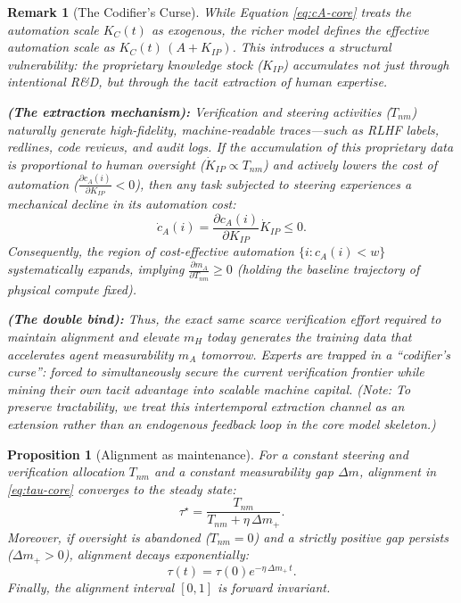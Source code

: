 \documentclass[12pt, letter]{article}
\newtheorem{proposition}{Proposition}
\newtheorem{remark}{Remark}
\begin{document}
\begin{remark}[The Codifier's Curse]\label{rem:senior-loop-core}
While Equation \eqref{eq:cA-core} treats the automation scale $K_C(t)$ as exogenous, the richer model defines the \emph{effective} automation scale as $K_C(t)\,(A + K_{IP})$. This introduces a structural vulnerability: the proprietary knowledge stock ($K_{IP}$) accumulates not just through intentional R\&D, but through the tacit extraction of human expertise.

\textbf{(The extraction mechanism):} Verification and steering activities ($T_{nm}$) naturally generate high-fidelity, machine-readable traces---such as RLHF labels, redlines, code reviews, and audit logs. If the accumulation of this proprietary data is proportional to human oversight ($\dot K_{IP} \propto T_{nm}$) and actively lowers the cost of automation ($\frac{\partial c_A(i)}{\partial K_{IP}} < 0$), then any task subjected to steering experiences a mechanical decline in its automation cost:
\[
\dot c_A(i)
=
\frac{\partial c_A(i)}{\partial K_{IP}} \dot K_{IP}
\le 0.
\]
Consequently, the region of cost-effective automation $\{i: c_A(i)<w\}$ systematically expands, implying $\frac{\partial m_A}{\partial T_{nm}} \ge 0$ (holding the baseline trajectory of physical compute fixed).

\textbf{(The double bind):} Thus, the exact same scarce verification effort required to maintain alignment and elevate $m_H$ today generates the training data that accelerates agent measurability $m_A$ tomorrow. Experts are trapped in a ``codifier's curse'': forced to simultaneously secure the current verification frontier while mining their own tacit advantage into scalable machine capital. \emph{(Note: To preserve tractability, we treat this intertemporal extraction channel as an extension rather than an endogenous feedback loop in the core model skeleton.)}
\end{remark}



\begin{proposition}[Alignment as maintenance]\label{prop:alignment-core}
For a constant steering and verification allocation $T_{nm}$ and a constant measurability gap $\Delta m$, alignment in \eqref{eq:tau-core} converges to the steady state:
\[
    \tau^\star = \frac{T_{nm}}{T_{nm}+\eta\,\Delta m_+}.
\]
Moreover, if oversight is abandoned ($T_{nm}=0$) and a strictly positive gap persists ($\Delta m_+>0$), alignment decays exponentially:
\[
    \tau(t) = \tau(0)e^{-\eta\,\Delta m_+\,t}.
\]
Finally, the alignment interval $[0,1]$ is forward invariant.
\end{proposition}
\end{document}
